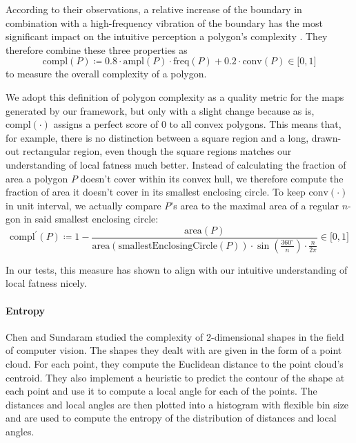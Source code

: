 According to their observations, a relative increase of the boundary in combination with a high-frequency vibration of the boundary has the most significant impact on the intuitive perception a polygon's complexity \cite{brinkhoff1995measuring}.
They therefore combine these three properties as
%
\begin{equation}
\text{compl}(P) \coloneqq
0.8 \cdot \text{ampl}(P) \cdot \text{freq}(P) + 0.2 \cdot \text{conv}(P)
\in \lbrack0,1\rbrack
\end{equation}
%
to measure the overall complexity of a polygon.

We adopt this definition of polygon complexity as a quality metric for the maps generated by our framework, but only with a slight change because as is, $\text{compl}(\cdot)$ assigns a perfect score of $0$ to all convex polygons.
This means that, for example, there is no distinction between a square region and a long, drawn-out rectangular region, even though the square regions matches our understanding of local fatness much better.
Instead of calculating the fraction of area a polygon $P$ doesn't cover within its convex hull, we therefore compute the fraction of area it doesn't cover in its smallest enclosing circle.
To keep $\text{conv}(\cdot)$ in unit interval, we actually compare $P$'s area to the maximal area of a regular $n$-gon in said smallest enclosing circle:
%
\begin{equation*}
\text{compl}^\prime(P) \coloneqq
1 - \frac{\text{area}(P)}{\text{area}(\text{smallestEnclosingCircle}(P)) \cdot \sin\left(\frac{360^\circ}{n}\right) \cdot \frac{n}{2\pi}}
\in \lbrack0,1\rbrack
\end{equation*}

In our tests, this measure has shown to align with our intuitive understanding of local fatness nicely.



\paragraph{Entropy}

Chen and Sundaram \cite{chen2005estimating} studied the complexity of 2-dimensional shapes in the field of computer vision.
The shapes they dealt with are given in the form of a point cloud.
For each point, they compute the Euclidean distance to the point cloud's centroid.
They also implement a heuristic to predict the contour of the shape at each point and use it to compute a local angle for each of the points.
The distances and local angles are then plotted into a histogram with flexible bin size and are used to compute the entropy of the distribution of distances and local angles.

